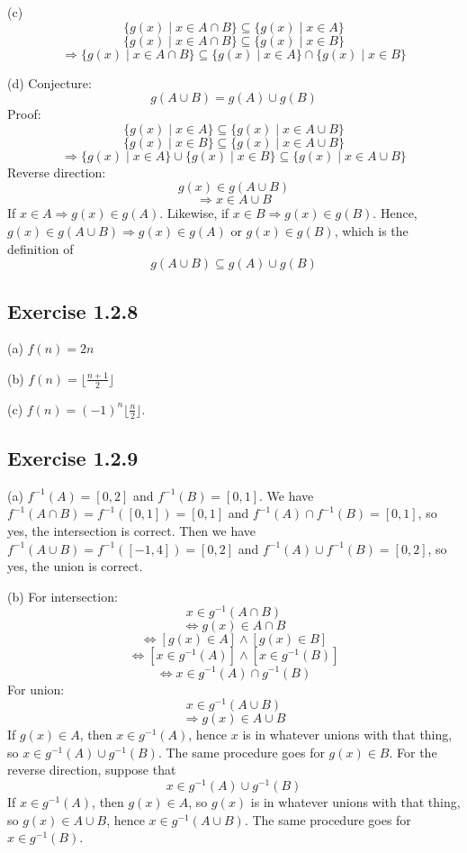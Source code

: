 \documentclass{book}
\begin{document}
\noindent
(c)
$$\{ g(x) \mid x \in A \cap B \} \subseteq \{ g(x) \mid x \in A \}$$
$$\{ g(x) \mid x \in A \cap B \} \subseteq \{ g(x) \mid x \in B \}$$
$$\Rightarrow \{ g(x) \mid x \in A \cap B \} \subseteq \{ g(x) \mid x \in A \} \cap \{ g(x) \mid x \in B \}$$

\noindent
(d)
Conjecture:
$$g(A \cup B) = g(A) \cup g(B)$$
Proof:
$$\{ g(x) \mid x \in A \} \subseteq \{ g(x) \mid x \in A \cup B \}$$
$$\{ g(x) \mid x \in B \} \subseteq \{ g(x) \mid x \in A \cup B \}$$
$$\Rightarrow \{ g(x) \mid x \in A \} \cup \{ g(x) \mid x \in B \} \subseteq \{ g(x) \mid x \in A \cup B \}$$
Reverse direction:
$$g(x) \in g(A \cup B)$$
$$\Rightarrow x \in A \cup B$$
If $x \in A \Rightarrow g(x) \in g(A)$. Likewise, if $x \in B \Rightarrow g(x) \in g(B)$. Hence, $g(x) \in g(A \cup B) \Rightarrow g(x) \in g(A)$ or $g(x) \in g(B)$, which is the definition of
$$g(A \cup B) \subseteq g(A) \cup g(B)$$

\subsection*{Exercise 1.2.8}
(a)
$f(n) = 2n$

\noindent
(b)
$f(n) = \lfloor \frac{n + 1}{2} \rfloor$

\noindent
(c)
$f(n) = (-1)^n \lfloor \frac{n}{2} \rfloor$.

\subsection*{Exercise 1.2.9}
(a)
$f^{-1}(A) = [0, 2]$ and $f^{-1}(B) = [0, 1]$. We have $f^{-1}(A \cap B) = f^{-1}([0, 1]) = [0, 1]$ and $f^{-1}(A) \cap f^{-1}(B) = [0,1]$, so yes, the intersection is correct. Then we have $f^{-1}(A \cup B) = f^{-1}([-1, 4]) = [0, 2]$ and $f^{-1}(A) \cup f^{-1}(B) = [0,2]$, so yes, the union is correct.

\noindent
(b)
For intersection:
$$x \in g^{-1}(A \cap B)$$
$$\Leftrightarrow g(x) \in A \cap B$$
$$\Leftrightarrow [g(x) \in A] \land [g(x) \in B]$$
$$\Leftrightarrow [x \in g^{-1}(A)] \land [x \in g^{-1}(B)]$$
$$\Leftrightarrow x \in g^{-1}(A) \cap g^{-1}(B)$$
For union:
$$x \in g^{-1}(A \cup B)$$
$$\Rightarrow g(x) \in A \cup B$$
If $g(x) \in A$, then $x \in g^{-1}(A)$, hence $x$ is in whatever unions with that thing, so $x \in g^{-1}(A) \cup g^{-1}(B)$. The same procedure goes for $g(x) \in B$. For the reverse direction, suppose that
$$x \in g^{-1}(A) \cup g^{-1}(B)$$
If $x \in g^{-1}(A)$, then $g(x) \in A$, so $g(x)$ is in whatever unions with that thing, so $g(x) \in A \cup B$, hence $x \in g^{-1}(A \cup B)$. The same procedure goes for $x \in g^{-1}(B)$.
\end{document}
